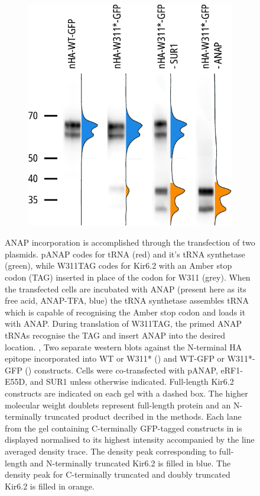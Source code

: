\begin{figure}[hbtp]
\begin{subfigure}[t]{0.4\textwidth}
		\includegraphics[width=\textwidth]{western_2.pdf}
	\end{subfigure}
	\caption[ANAP incorporation]{
	 ANAP incorporation is accomplished through the transfection of two plasmids.
	pANAP codes for tRNA (red) and it's tRNA synthetase (green), while W311TAG codes for Kir6.2 with an Amber stop codon (TAG) inserted in place of the codon for W311 (grey).
	When the transfected cells are incubated with ANAP (present here as its free acid, ANAP-TFA, blue) the tRNA synthetase assembles tRNA which is capable of recognising the Amber stop codon and loads it with ANAP.
	During translation of W311TAG, the primed ANAP tRNAs recognise the TAG and insert ANAP into the desired location.
	,  Two separate western blots against the N-terminal HA epitope incorporated into WT or W311* () and WT-GFP or W311*-GFP () constructs.
	Cells were co-transfected with pANAP, eRF1-E55D, and SUR1 unless otherwise indicated.
	Full-length Kir6.2 constructs are indicated on each gel with a dashed box.
	The higher molecular weight doublets represent full-length protein and an N-terminally truncated product decribed in the methods.
	 Each lane from the gel containing C-terminally GFP-tagged constructs in  is displayed normalised to its highest intensity accompanied by the line averaged density trace.
	The density peak corresponding to full-length and N-terminally truncated Kir6.2 is filled in blue.
	The density peak for C-terminally truncated and doubly truncated Kir6.2 is filled in orange.
	}\label{ch3fig:anap_incorporation}
\end{figure}

